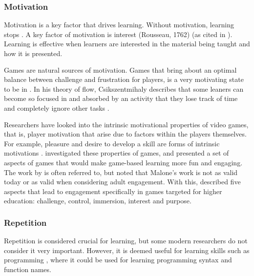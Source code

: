 \documentclass[a4paper,11.5pt]{report}
\numberwithin{figure}{section}
\numberwithin{table}{section}
\numberwithin{equation}{section}
\numberwithin{equation}{section}
\begin{document}
\subsubsection{Motivation}

Motivation is a key factor that drives learning. Without motivation, learning stops \citep{Gee2003}. A key factor of motivation is interest (Rousseau, 1762) (as cited in \citet{roungas2015}). Learning is effective when learners are interested in the material being taught and how it is presented. 

Games are natural sources of motivation. Games that bring about an optimal balance between challenge and frustration for players, is a very motivating state to be in \citep{Gee2003}. In his theory of flow, Csikszentmihaly describes that some leaners can become so focused in and absorbed by an activity that they lose track of time and completely ignore other tasks \citep{flow}. 

Researchers have looked into the intrinsic motivational properties of video games, that is, player motivation that arise due to factors within the players themselves. For example, pleasure and desire to develop a skill are forms of intrinsic motivations \citep{roungas2015}. \citet{Malone1987} investigated these properties of games, and presented a set of aspects of games that would make game-based learning more fun and engaging. The work by \citeauthor{Malone1987} is often referred to, but \citet{whitton2011} noted that Malone's work is not as valid today or as valid when considering adult engagement. With this, \citeauthor{whitton2011} described five aspects that lead to engagement specifically in games targeted for higher education: challenge, control, immersion, interest and purpose.


\subsubsection{Repetition}

Repetition is considered crucial for learning, but some modern researchers do not consider it very important. However, it is deemed useful for learning skills such as programming \citep{roungas2015}, where it could be used for learning programming syntax and function names.
\end{document}
